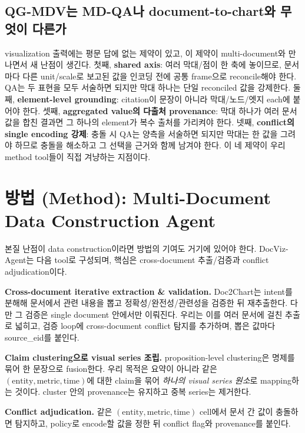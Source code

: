 \documentclass[11pt]{article}
\begin{document}
\subsection{QG-MDV는 MD-QA나 document-to-chart와 무엇이 다른가}
\label{sec:diff}

visualization 출력에는 평문 답에 없는 제약이 있고, 이 제약이 multi-document와 만나면서 새 난점이
생긴다. 첫째, \textbf{shared axis}: 여러 막대/점이 한 축에 놓이므로, 문서마다 다른 unit/scale로
보고된 값을 인코딩 전에 공통 frame으로 reconcile해야 한다. QA는 두 표현을 모두 서술하면 되지만
막대 하나는 단일 reconciled 값을 강제한다. 둘째, \textbf{element-level grounding}: citation이
문장이 아니라 막대/노드/엣지 each에 붙어야 한다. 셋째, \textbf{aggregated value의 다출처
provenance}: 막대 하나가 여러 문서 값을 합친 결과면 그 하나의 element가 복수 출처를 가리켜야
한다. 넷째, \textbf{conflict의 single encoding 강제}: 충돌 시 QA는 양측을 서술하면 되지만 막대는
한 값을 그려야 하므로 충돌을 해소하고 그 선택을 근거와 함께 남겨야 한다. 이 네 제약이 우리
method tool들이 직접 겨냥하는 지점이다.

\section{방법 (Method): Multi-Document Data Construction Agent}
\label{sec:method}

본질 난점이 data construction이라면 방법의 기여도 거기에 있어야 한다. DocViz-Agent는 다음 tool로
구성되며, 핵심은 cross-document 추출/검증과 conflict adjudication이다.

\textbf{Cross-document iterative extraction \& validation.} Doc2Chart는 intent를 분해해 문서에서
관련 내용을 뽑고 정확성/완전성/관련성을 검증한 뒤 재추출한다. 다만 그 검증은 single document
안에서만 이뤄진다. 우리는 이를 여러 문서에 걸친 추출로 넓히고, 검증 loop에 cross-document conflict
탐지를 추가하며, 뽑은 값마다 source\_eid를 붙인다.

\textbf{Claim clustering으로 visual series 조립.} proposition-level clustering은 명제를 묶어 한
문장으로 fusion한다. 우리 목적은 요약이 아니라 같은 $(\text{entity},\text{metric},\text{time})$에
대한 claim을 묶어 \emph{하나의 visual series 원소}로 mapping하는 것이다. cluster 안의 provenance는
유지하고 중복 series는 제거한다.

\textbf{Conflict adjudication.} 같은 $(\text{entity},\text{metric},\text{time})$ cell에서 문서 간
값이 충돌하면 탐지하고, policy로 encode할 값을 정한 뒤 conflict flag와 provenance를 붙인다.
\end{document}
